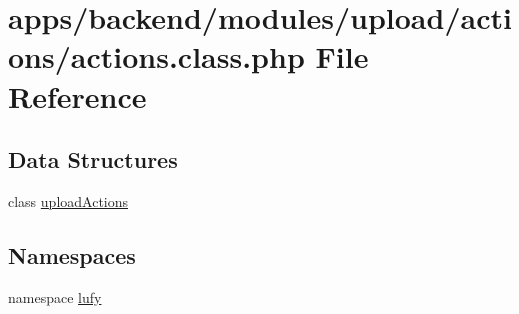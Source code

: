 \hypertarget{backend_2modules_2upload_2actions_2actions_8class_8php}{\section{apps/backend/modules/upload/actions/actions.class.\-php File Reference}
\label{backend_2modules_2upload_2actions_2actions_8class_8php}
}
\subsection*{Data Structures}
\begin{DoxyCompactItemize}
\item 
class \hyperlink{classupload_actions}{upload\-Actions}
\end{DoxyCompactItemize}
\subsection*{Namespaces}
\begin{DoxyCompactItemize}
\item 
namespace \hyperlink{namespacelufy}{lufy}
\end{DoxyCompactItemize}
